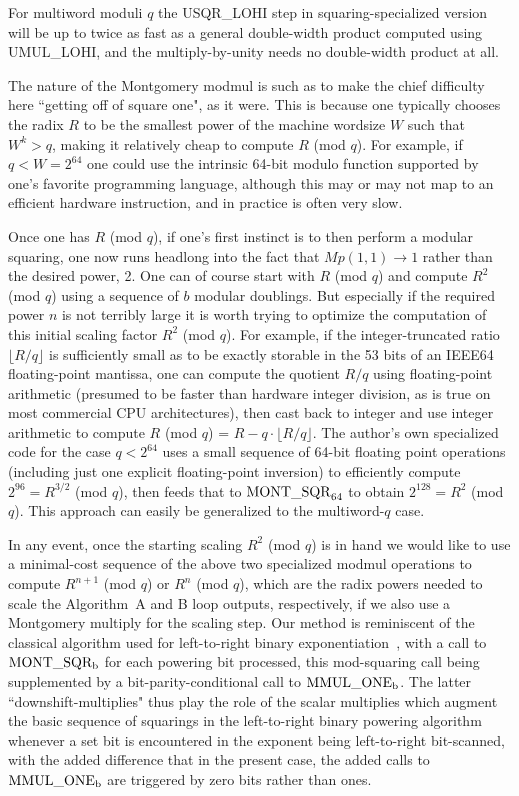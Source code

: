 \documentclass{article}
\newcommand \ra {\rightarrow}
\begin{document}
For multiword moduli $q$ the USQR\_LOHI step in squaring-specialized version will be up to twice as fast as a general double-width product computed using UMUL\_LOHI, and the multiply-by-unity needs no double-width product at all.


The nature of the Montgomery modmul is such as to make the chief difficulty here ``getting off of square one", as it were. This is because one typically chooses the radix $R$ to be the smallest power of the machine wordsize $W$ such that $W^k > q$, making it relatively cheap to compute $R$ (mod $q$). For example, if $q < W = 2^{64}$ one could use the intrinsic 64-bit modulo function supported by one's favorite programming language, although this may or may not map to an efficient hardware instruction, and in practice is often very slow.

Once one has $R$ (mod $q$), if one's first instinct is to then perform a modular squaring, one now runs headlong into the fact that $Mp(1,1) \ra 1$ rather than the desired power, 2. One can of course start with $R$ (mod $q$) and compute $R^2$ (mod $q$) using a sequence of $b$ modular doublings. But especially if the required power $n$ is not terribly large it is worth trying to optimize the computation of this initial scaling factor $R^2$ (mod $q$). For example, if the integer-truncated ratio $\lfloor R/q \rfloor$ is sufficiently small as to be exactly storable in the 53 bits of an IEEE64 floating-point mantissa, one can compute the quotient $R/q$ using floating-point arithmetic (presumed to be faster than hardware integer division, as is true on most commercial CPU architectures), then cast back to integer and use integer arithmetic to compute $R$ (mod $q$) = $R - q \cdot \lfloor R/q \rfloor$. The author's own specialized code for the case $q < 2^{64}$ uses a small sequence of 64-bit floating point operations (including just one explicit floating-point inversion) to efficiently compute $2^{96} = R^{3/2}$ (mod $q$), then feeds that to ${\rm MONT\_SQR}_{64}$ to obtain $2^{128} = R^2$ (mod $q$). This approach can easily be generalized to the multiword-$q$ case.

In any event, once the starting scaling $R^2$ (mod $q$) is in hand we would like to use a minimal-cost sequence of the above two specialized modmul operations to compute $R^{n+1}$ (mod $q$) or $R^n$ (mod $q$), which are the radix powers needed to scale the Algorithm~A and B loop outputs, respectively, if we also use a Montgomery multiply for the scaling step. Our method is reminiscent of the classical algorithm used for left-to-right binary exponentiation~\cite{Knuth}, with a call to ${\rm MONT\_SQR_b}$ for each powering bit processed, this mod-squaring call being supplemented by a bit-parity-conditional call to ${\rm MMUL\_ONE_b}$. The latter ``downshift-multiplies" thus play the role of the scalar multiplies which augment the basic sequence of squarings in the left-to-right binary powering algorithm whenever a set bit is encountered in the exponent being left-to-right bit-scanned, with the added difference that in the present case, the added calls to ${\rm MMUL\_ONE_b}$ are triggered by zero bits rather than ones.
\end{document}
